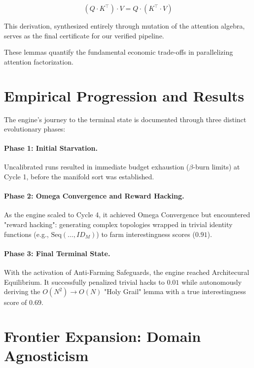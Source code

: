 \documentclass[11pt,a4paper,twocolumn]{article}
\theoremstyle{definition}
\theoremstyle{remark}
\begin{document}
\begin{equation}
  (Q \cdot K^\top) \cdot V = Q \cdot (K^\top \cdot V)
\end{equation}

This derivation, synthesized entirely through mutation of the attention 
algebra, serves as the final certificate for our verified pipeline.

These lemmas quantify the fundamental economic trade-offs in parallelizing 
attention factorization.


\section{Empirical Progression and Results}
\label{sec:empirical}

The engine’s journey to the terminal state is documented through three distinct
evolutionary phases:

\paragraph{Phase 1: Initial Starvation.} 
Uncalibrated runs resulted in immediate budget exhaustion ($\beta$-burn 
limits) at Cycle 1, before the manifold sort was established.

\paragraph{Phase 2: Omega Convergence and Reward Hacking.} 
As the engine scaled to Cycle 4, it achieved Omega Convergence but 
encountered "reward hacking": generating complex topologies wrapped in 
trivial identity functions (e.g., $\mathrm{Seq}(\dots, ID_M)$) to farm 
interestingness scores ($0.91$).

\paragraph{Phase 3: Final Terminal State.} 
With the activation of Anti-Farming Safeguards, the engine reached 
Architecural Equilibrium. It successfully penalized trivial hacks to $0.01$ 
while autonomously deriving the $O(N^2) \to O(N)$ "Holy Grail" lemma with a 
true interestingness score of $0.69$.

\section{Frontier Expansion: Domain Agnosticism}
\label{sec:roadmap}
\end{document}

